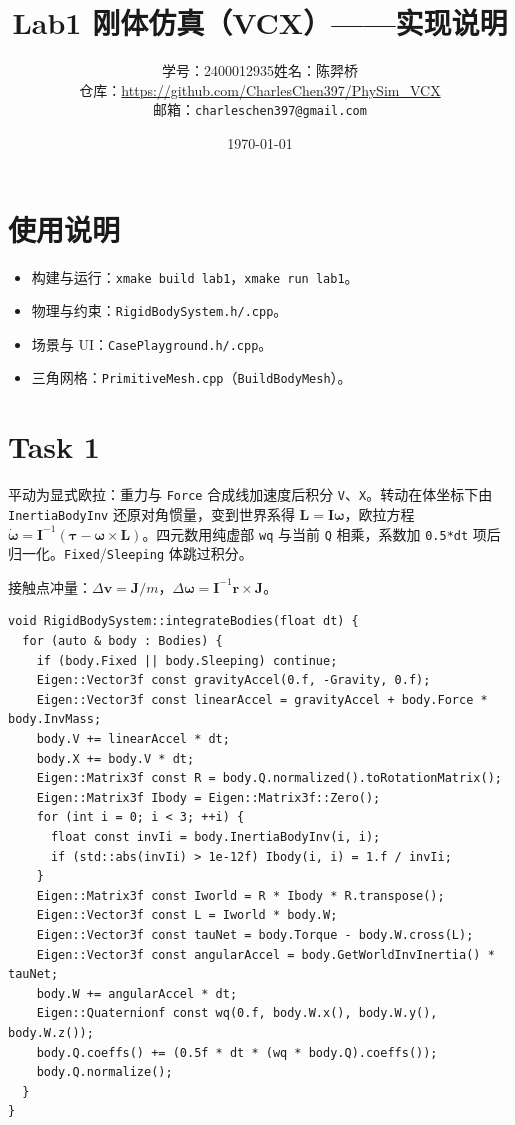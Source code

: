\documentclass[UTF8,a4paper,11pt]{ctexart}
\title{Lab1 刚体仿真（VCX）——实现说明}
\author{学号：2400012935\quad 姓名：陈羿桥\\[0.35em]
\small 仓库：\url{https://github.com/CharlesChen397/PhySim_VCX}\\[0.15em]
\small 邮箱：\texttt{charleschen397@gmail.com}}
\date{\today}
\begin{document}
\maketitle

\section{使用说明}
\begin{itemize}[leftmargin=*]
  \item 构建与运行：\texttt{xmake build lab1}，\texttt{xmake run lab1}。
  \item 物理与约束：\texttt{RigidBodySystem.h/.cpp}。
  \item 场景与 UI：\texttt{CasePlayground.h/.cpp}。
  \item 三角网格：\texttt{PrimitiveMesh.cpp}（\texttt{BuildBodyMesh}）。
\end{itemize}

\section{Task 1}
平动为显式欧拉：重力与 \texttt{Force} 合成线加速度后积分 \texttt{V}、\texttt{X}。转动在体坐标下由 \texttt{InertiaBodyInv} 还原对角惯量，变到世界系得 $\mathbf{L}=\mathbf{I}\boldsymbol{\omega}$，欧拉方程 $\dot{\boldsymbol{\omega}}=\mathbf{I}^{-1}(\boldsymbol{\tau}-\boldsymbol{\omega}\times\mathbf{L})$。四元数用纯虚部 \texttt{wq} 与当前 \texttt{Q} 相乘，系数加 \texttt{0.5*dt} 项后归一化。\texttt{Fixed}/\texttt{Sleeping} 体跳过积分。

接触点冲量：$\Delta\mathbf{v}=\mathbf{J}/m$，$\Delta\boldsymbol{\omega}=\mathbf{I}^{-1}\mathbf{r}\times\mathbf{J}$。

\begin{lstlisting}
void RigidBodySystem::integrateBodies(float dt) {
  for (auto & body : Bodies) {
    if (body.Fixed || body.Sleeping) continue;
    Eigen::Vector3f const gravityAccel(0.f, -Gravity, 0.f);
    Eigen::Vector3f const linearAccel = gravityAccel + body.Force * body.InvMass;
    body.V += linearAccel * dt;
    body.X += body.V * dt;
    Eigen::Matrix3f const R = body.Q.normalized().toRotationMatrix();
    Eigen::Matrix3f Ibody = Eigen::Matrix3f::Zero();
    for (int i = 0; i < 3; ++i) {
      float const invIi = body.InertiaBodyInv(i, i);
      if (std::abs(invIi) > 1e-12f) Ibody(i, i) = 1.f / invIi;
    }
    Eigen::Matrix3f const Iworld = R * Ibody * R.transpose();
    Eigen::Vector3f const L = Iworld * body.W;
    Eigen::Vector3f const tauNet = body.Torque - body.W.cross(L);
    Eigen::Vector3f const angularAccel = body.GetWorldInvInertia() * tauNet;
    body.W += angularAccel * dt;
    Eigen::Quaternionf const wq(0.f, body.W.x(), body.W.y(), body.W.z());
    body.Q.coeffs() += (0.5f * dt * (wq * body.Q).coeffs());
    body.Q.normalize();
  }
}
\end{lstlisting}
\end{document}
